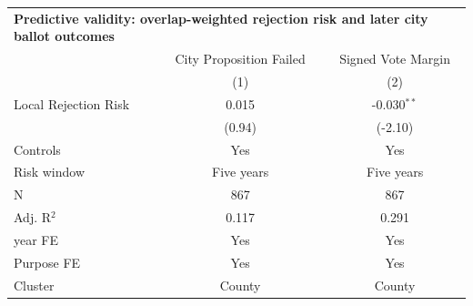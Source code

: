 \begingroup
\centering
\begin{tabular*}{\textwidth}{@{\extracolsep{\fill}}lcc}
\multicolumn{3}{l}{\textbf{Predictive validity: overlap-weighted rejection risk and later city ballot outcomes}}\\

\addlinespace
   \toprule
                        & City Proposition Failed & Signed Vote Margin\\
                        & (1)                     & (2)\\
   \midrule
   Local Rejection Risk & 0.015                   & -0.030$^{**}$\\
                        & (0.94)                 & (-2.10)\\
   Controls             & Yes                     & Yes\\
   Risk window          & Five years              & Five years\\
   \hline
   N         & 867                     & 867\\
   Adj. R$^2$       & 0.117                   & 0.291\\
   year FE              & Yes                     & Yes\\
   Purpose FE           & Yes                     & Yes\\
   Cluster              & County & County\\
   \bottomrule
\end{tabular*}
\par\endgroup
